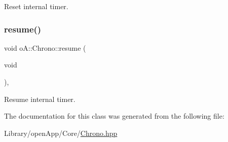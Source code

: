Reset internal timer. 

\mbox{\label{classo_a_1_1_chrono_a2056863ec3fa0a94ed02fa0393b116e9}} 
\subsubsection{\texorpdfstring{resume()}{resume()}}
{\footnotesize\ttfamily void o\+A\+::\+Chrono\+::resume (\begin{DoxyParamCaption}\item[{void}]{ }\end{DoxyParamCaption})\hspace{0.3cm}{\ttfamily [inline]}, {\ttfamily [noexcept]}}



Resume internal timer. 



The documentation for this class was generated from the following file\+:\begin{DoxyCompactItemize}
\item 
Library/open\+App/\+Core/\mbox{\hyperlink{_chrono_8hpp}{Chrono.\+hpp}}\end{DoxyCompactItemize}
